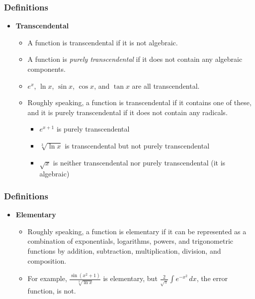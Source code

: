 \documentclass{beamer}
\numberwithin{equation}{section} %
\begin{document}
\begin{frame}
    \frametitle{Definitions}
    \begin{itemize}
        \item {\bf Transcendental}
        \begin{itemize}
            \item A function is transcendental if it is not algebraic.  
            \item A function is \textit{purely transcendental} if it does
            not contain any algebraic components.  
            \item $e^x$, $\ln{x}$, $\sin{x}$, $\cos{x}$, and $\tan{x}$ are
            all transcendental.  
            \item Roughly speaking, a function is transcendental if it
            contains one of these, and it is purely transcendental if it
            does not contain any radicals.
            \begin{itemize}
                \item $e^{x + 1}$ is purely transcendental
                \item $\sqrt[3]{\ln{x}}$ is transcendental but not
                purely transcendental
                \item $\sqrt{x}$ is neither transcendental nor purely
                transcendental (it is algebraic)
            \end{itemize}
        \end{itemize}
    \end{itemize}
\end{frame}

\begin{frame}
    \frametitle{Definitions}
    \begin{itemize}
        \item {\bf Elementary}
        \begin{itemize}
            \item Roughly speaking, a function is elementary if it can
            be represented as a combination of exponentials, logarithms,
            powers, and trigonometric functions by addition,
            subtraction, multiplication, division, and composition. 
            \item For example, $\frac{\sin{(x^2 +
            1)}}{\sqrt[3]{\ln{x}}}$ is elementary, but
            $\frac{2}{\sqrt{\pi}}\int{e^{-x^2}\,dx}$, the error
            function, is not.
        \end{itemize}
    \end{itemize}
\end{frame}
\end{document}
